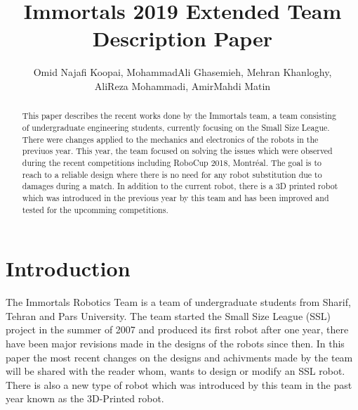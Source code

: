 \documentclass[runningheads,a4paper]{llncs}
\title{Immortals 2019 Extended Team Description Paper}
\author{\normalsize Omid Najafi Koopai{\textsupsub{\small\texttt{1}}{}}, 
MohammadAli Ghasemieh{\textsupsub{\small\texttt{2}}{}}, 
Mehran Khanloghy{\textsupsub{\small\texttt{3}}{}}, \\
\normalsize AliReza Mohammadi{\textsupsub{\small\texttt{3}}{}}, 
AmirMahdi Matin{\textsupsub{\small\texttt{3}}{}}
}
\institute{Sharif University of Technology, \\
\texttt{http://devoted-web-site.url}}
\begin{document}
\maketitle


%
%

\begin{abstract}
This paper describes the recent works done by the Immortals team, a team consisting of undergraduate engineering students, currently focusing on the Small Size League. There were changes applied to the mechanics and electronics of the robots in the previuos year. This year, the team focused on solving the issues which were observed during the recent competitions including RoboCup 2018, Montréal. The goal is to reach to a reliable design where there is no need for any robot substitution due to damages during a match. In addition to the current robot, there is a 3D printed robot which was introduced in the previous year by this team and has been improved and tested for the upcomming competitions.

\end{abstract}


\justify
\section{Introduction}
The Immortals Robotics Team is a team of undergraduate students from Sharif, Tehran and Pars University. The team started the Small Size League (SSL) project in the summer of 2007 and produced its first robot after one year, there have been major revisions made in the designs of the robots since then. In this paper the most recent changes on the designs and achivments made by the team will be shared with the reader whom, wants to design or modify an SSL robot. There is also a new type of robot which was introduced by this team in the past year known as the 3D-Printed robot.%
\end{document}
